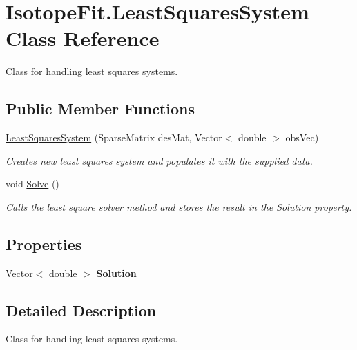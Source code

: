 \hypertarget{class_isotope_fit_1_1_least_squares_system}{}\section{Isotope\+Fit.\+Least\+Squares\+System Class Reference}
\label{class_isotope_fit_1_1_least_squares_system}


Class for handling least squares systems.  


\subsection*{Public Member Functions}
\begin{DoxyCompactItemize}
\item 
\hyperlink{class_isotope_fit_1_1_least_squares_system_aec0b3973e7239d006b752a4e079f80d0}{Least\+Squares\+System} (Sparse\+Matrix des\+Mat, Vector$<$ double $>$ obs\+Vec)
\begin{DoxyCompactList}\small\item\em Creates new least squares system and populates it with the supplied data. \end{DoxyCompactList}\item 
void \hyperlink{class_isotope_fit_1_1_least_squares_system_ac72b8568e9ecb97077102658f56aba3f}{Solve} ()
\begin{DoxyCompactList}\small\item\em Calls the least square solver method and stores the result in the Solution property. \end{DoxyCompactList}\end{DoxyCompactItemize}
\subsection*{Properties}
\begin{DoxyCompactItemize}
\item 
\mbox{\label{class_isotope_fit_1_1_least_squares_system_a843dc1bf5e21d7a6a6ac9d5339386f92}} 
Vector$<$ double $>$ {\bfseries Solution}
\end{DoxyCompactItemize}


\subsection{Detailed Description}
Class for handling least squares systems. 



